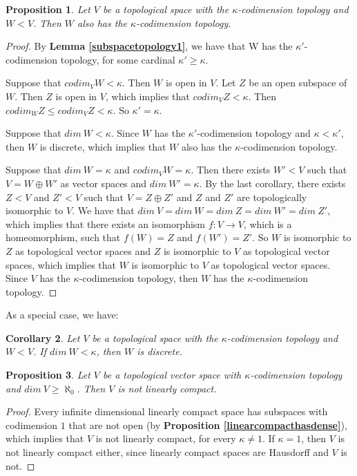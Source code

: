 \documentclass[a4paper,12pt]{article}
\newtheorem{prop}{Proposition}[section]
\newtheorem{cor}[prop]{Corollary}
\theoremstyle{bloco}
\begin{document}
\begin{prop}\label{subspacetopology}Let $V$ be a topological space with the $\kappa$-codimension topology and $W < V$. Then $W$ also has the $\kappa$-codimension topology.
\end{prop}

\begin{proof}By \textbf{Lemma \ref{subspacetopology1}}, we have that W has the $\kappa'$-codimension topology, for some cardinal $\kappa' \geqslant \kappa$.

Suppose that $codim_{V} W < \kappa$. Then $W$ is open in $V$. Let $Z$ be an open subspace of $W$. Then $Z$ is open in $V$, which implies that $codim_{V} Z < \kappa$. Then $codim_{W}Z \leqslant codim_{V}Z < \kappa$. So $\kappa' = \kappa$.

Suppose that $dim \ W < \kappa$. Since $W$ has the $\kappa'$-codimension topology and $\kappa < \kappa'$, then $W$ is discrete, which implies that $W$ also has the $\kappa$-codimension topology.

Suppose that $dim \ W = \kappa$ and $codim_{V} W = \kappa$. Then there exists $W' < V$ such that $V = W \oplus W'$ as vector spaces and $dim \ W' = \kappa$. By the last corollary, there exists $Z < V$ and $Z'< V$ such that $V = Z \oplus Z'$ and $Z$ and $Z'$ are topologically isomorphic to $V$. We have that $dim \ V = dim \ W = dim \ Z = dim \ W' = dim \ Z'$, which implies that there exists an isomorphism $f: V \rightarrow V$, which is a homeomorphism, such that $f(W) = Z$ and $f(W') = Z'$. So $W$ is isomorphic to $Z$ as topological vector spaces and $Z$ is isomorphic to $V$ as topological vector spaces, which implies that $W$ is isomorphic to $V$ as topological vector spaces. Since $V$ has the $\kappa$-codimension topology, then $W$ has the $\kappa$-codimension topology.
\end{proof}

As a special case, we have:

\begin{cor}Let $V$ be a topological space with the $\kappa$-codimension topology and $W < V$. If $dim \ W < \kappa$, then $W$ is discrete.
\end{cor}

\begin{prop}\label{theyarenotlinearlycompact}Let $V$ be a topological vector space with $\kappa$-codimension topology and $dim \ V \geqslant \aleph_{0}$. Then $V$ is not linearly compact.
\end{prop}

\begin{proof}Every infinite dimensional linearly compact space has subspaces with codimension $1$ that are not open (by \textbf{Proposition \ref{linearcompacthasdense}}), which implies that $V$ is not linearly compact, for every $\kappa \neq 1$. If $\kappa = 1$, then $V$ is not linearly compact either, since linearly compact spaces are Hausdorff and $V$ is not. 
\end{proof}
\end{document}
